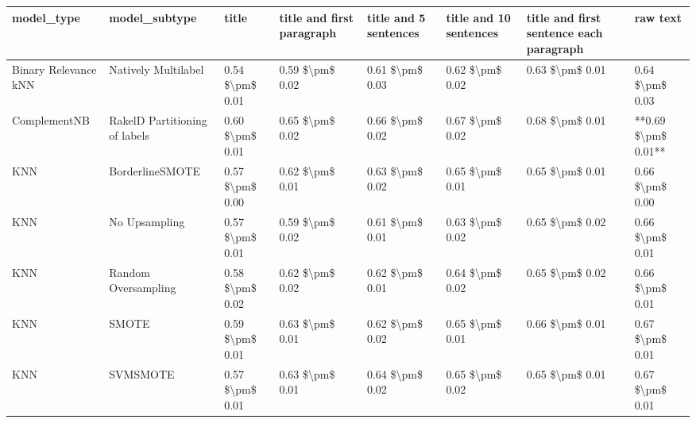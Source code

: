 \begin{tabular}{llllllll}
\toprule
                     model\_type &                 model\_subtype &           title & title and first paragraph & title and 5 sentences & title and 10 sentences & title and first sentence each paragraph &            raw text \\
\midrule
           Binary Relevance kNN &           Natively Multilabel & 0.54 \$\textbackslash pm\$ 0.01 &           0.59 \$\textbackslash pm\$ 0.02 &       0.61 \$\textbackslash pm\$ 0.03 &        0.62 \$\textbackslash pm\$ 0.02 &                         0.63 \$\textbackslash pm\$ 0.01 &     0.64 \$\textbackslash pm\$ 0.03 \\
                   ComplementNB & RakelD Partitioning of labels & 0.60 \$\textbackslash pm\$ 0.01 &           0.65 \$\textbackslash pm\$ 0.02 &       0.66 \$\textbackslash pm\$ 0.02 &        0.67 \$\textbackslash pm\$ 0.02 &                         0.68 \$\textbackslash pm\$ 0.01 & **0.69 \$\textbackslash pm\$ 0.01** \\
                            KNN &               BorderlineSMOTE & 0.57 \$\textbackslash pm\$ 0.00 &           0.62 \$\textbackslash pm\$ 0.01 &       0.63 \$\textbackslash pm\$ 0.02 &        0.65 \$\textbackslash pm\$ 0.01 &                         0.65 \$\textbackslash pm\$ 0.01 &     0.66 \$\textbackslash pm\$ 0.00 \\
                            KNN &                 No Upsampling & 0.57 \$\textbackslash pm\$ 0.01 &           0.59 \$\textbackslash pm\$ 0.02 &       0.61 \$\textbackslash pm\$ 0.01 &        0.63 \$\textbackslash pm\$ 0.02 &                         0.65 \$\textbackslash pm\$ 0.02 &     0.66 \$\textbackslash pm\$ 0.01 \\
                            KNN &           Random Oversampling & 0.58 \$\textbackslash pm\$ 0.02 &           0.62 \$\textbackslash pm\$ 0.02 &       0.62 \$\textbackslash pm\$ 0.01 &        0.64 \$\textbackslash pm\$ 0.02 &                         0.65 \$\textbackslash pm\$ 0.02 &     0.66 \$\textbackslash pm\$ 0.01 \\
                            KNN &                         SMOTE & 0.59 \$\textbackslash pm\$ 0.01 &           0.63 \$\textbackslash pm\$ 0.01 &       0.62 \$\textbackslash pm\$ 0.02 &        0.65 \$\textbackslash pm\$ 0.01 &                         0.66 \$\textbackslash pm\$ 0.01 &     0.67 \$\textbackslash pm\$ 0.01 \\
                            KNN &                      SVMSMOTE & 0.57 \$\textbackslash pm\$ 0.01 &           0.63 \$\textbackslash pm\$ 0.01 &       0.64 \$\textbackslash pm\$ 0.02 &        0.65 \$\textbackslash pm\$ 0.02 &                         0.65 \$\textbackslash pm\$ 0.01 &     0.67 \$\textbackslash pm\$ 0.01 \\

\end{tabular}
